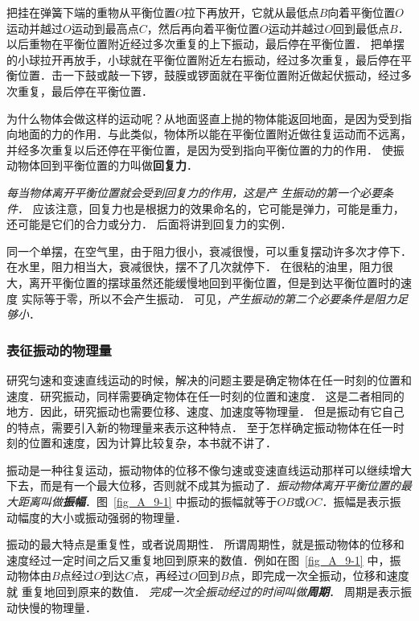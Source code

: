 把挂在弹簧下端的重物从平衡位置$O$拉下再放开，它就从最低点$B$向着平衡位置$O$运动并越过$O$运动到最高点$C$，然后再向着平衡位置$O$运动并越过$O$回到最低点$B$．以后重物在平衡位置附近经过多次重复的上下振动，最后停在平衡位置．
把单摆的小球拉开再放手，小球就在平衡位置附近左右振动，经过多次重复，最后停在平衡位置．击一下鼓或敲一下锣，鼓膜或锣面就在平衡位置附近做起伏振动，经过多次重复，最后停在平衡位置．

为什么物体会做这样的运动呢？从地面竖直上抛的物体能返回地面，是因为受到指向地面的力的作用．与此类似，物体所以能在平衡位置附近做往复运动而不远离，并经多次重复以后还停在平衡位置，是因为受到指向平衡位置的力的作用．
使振动物体回到平衡位置的力叫做\textbf{回复力}．

\textit{每当物体离开平衡位置就会受到回复力的作用，这是产
生振动的第一个必要条件}．
应该注意，回复力也是根据力的效果命名的，它可能是弹力，可能是重力，还可能是它们的合力或分力．
后面将讲到回复力的实例．

同一个单摆，在空气里，由于阻力很小，衰减很慢，可以重复摆动许多次才停下．在水里，阻力相当大，衰减很快，摆不了几次就停下．
在很粘的油里，阻力很大，离开平衡位置的摆球虽然还能缓慢地回到平衡位置，但是到达平衡位置时的速度
实际等于零，所以不会产生振动．
可见，\textit{产生振动的第二个必要条件是阻力足够小}．

\subsubsection{表征振动的物理量}

研究匀速和变速直线运动的时候，解决的问题主要是确定物体在任一时刻的位置和速度．研究振动，同样需要确定物体在任一时刻的位置和速度．
这是二者相同的地方．因此，研究振动也需要位移、速度、加速度等物理量．
但是振动有它自己的特点，需要引入新的物理量来表示这种特点．
至于怎样确定振动物体在任一时刻的位置和速度，因为计算比较复杂，本书就不讲了．

振动是一种往复运动，振动物体的位移不像匀速或变速直线运动那样可以继续增大下去，而是有一个最大位移，否则就不成其为振动了．\textit{振动物体离开平衡位置的最大距离叫做\textbf{振幅}}．图~\ref{fig_A_9-1} 中振动的振幅就等于$OB$或$OC$．振幅是表示振动幅度的大小或振动强弱的物理量．




振动的最大特点是重复性，或者说周期性．
所谓周期性，就是振动物体的位移和速度经过一定时间之后又重复地回到原来的数值．例如在图~\ref{fig_A_9-1} 中，振动物体由$B$点经过$O$到达$C$点，再经过$O$回到$B$点，即完成一次全振动，位移和速度就
重复地回到原来的数值．
\textit{完成一次全振动经过的时间叫做\textbf{周期}}．
周期是表示振动快慢的物理量．


